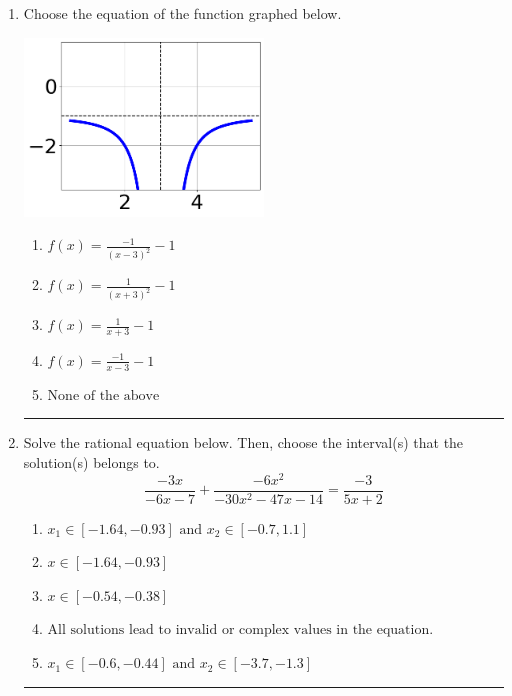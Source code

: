 \documentclass[14pt]{extbook}
\newcommand{\litem}[1]{\item#1\hspace*{-1cm}\rule{\textwidth}{0.4pt}}
\begin{document}
\begin{enumerate}
{\begin{enumerate}[label=\Alph*.]
\end{enumerate} }
\litem{
Choose the equation of the function graphed below.
\begin{center}
    \includegraphics[width=0.5\textwidth]{../Figures/rationalGraphToEquationA.png}
\end{center}
\begin{enumerate}[label=\Alph*.]
\item \( f(x) = \frac{-1}{(x - 3)^2} - 1 \)
\item \( f(x) = \frac{1}{(x + 3)^2} - 1 \)
\item \( f(x) = \frac{1}{x + 3} - 1 \)
\item \( f(x) = \frac{-1}{x - 3} - 1 \)
\item \( \text{None of the above} \)

\end{enumerate} }
\litem{
Solve the rational equation below. Then, choose the interval(s) that the solution(s) belongs to.\[ \frac{-3x}{-6x -7} + \frac{-6x^{2}}{-30x^{2} -47 x -14} = \frac{-3}{5x + 2} \]\begin{enumerate}[label=\Alph*.]
\item \( x_1 \in [-1.64, -0.93] \text{ and } x_2 \in [-0.7,1.1] \)
\item \( x \in [-1.64,-0.93] \)
\item \( x \in [-0.54,-0.38] \)
\item \( \text{All solutions lead to invalid or complex values in the equation.} \)
\item \( x_1 \in [-0.6, -0.44] \text{ and } x_2 \in [-3.7,-1.3] \)


\end{enumerate}}
\end{enumerate}
\end{document}
